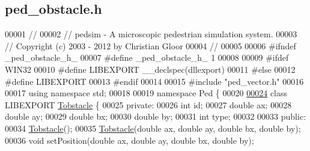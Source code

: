 \hypertarget{ped__obstacle_8h_source}{
\subsection{ped\_\-obstacle.h}
}

\begin{DoxyCode}
00001 \textcolor{comment}{//}
00002 \textcolor{comment}{// pedsim - A microscopic pedestrian simulation system. }
00003 \textcolor{comment}{// Copyright (c) 2003 - 2012 by Christian Gloor}
00004 \textcolor{comment}{//                              }
00005 
00006 \textcolor{preprocessor}{#ifndef \_ped\_obstacle\_h\_}
00007 \textcolor{preprocessor}{}\textcolor{preprocessor}{#define \_ped\_obstacle\_h\_ 1}
00008 \textcolor{preprocessor}{}
00009 \textcolor{preprocessor}{#ifdef WIN32}
00010 \textcolor{preprocessor}{}\textcolor{preprocessor}{#define LIBEXPORT \_\_declspec(dllexport)}
00011 \textcolor{preprocessor}{}\textcolor{preprocessor}{#else}
00012 \textcolor{preprocessor}{}\textcolor{preprocessor}{#define LIBEXPORT}
00013 \textcolor{preprocessor}{}\textcolor{preprocessor}{#endif}
00014 \textcolor{preprocessor}{}
00015 \textcolor{preprocessor}{#include "ped\_vector.h"}
00016 
00017 \textcolor{keyword}{using namespace }std;
00018 
00019 \textcolor{keyword}{namespace }Ped \{
00020         
\hypertarget{ped__obstacle_8h_source_l00024}{}\hyperlink{classPed_1_1Tobstacle}{00024}         \textcolor{keyword}{class }LIBEXPORT \hyperlink{classPed_1_1Tobstacle}{Tobstacle} \{
00025         \textcolor{keyword}{private}:
00026                 \textcolor{keywordtype}{int} id;                                            
00027                 \textcolor{keywordtype}{double} ax;                                         
00028                 \textcolor{keywordtype}{double} ay;                                         
00029                 \textcolor{keywordtype}{double} bx;                                         
00030                 \textcolor{keywordtype}{double} by;                                         
00031                 \textcolor{keywordtype}{int} type;                                         
00032                 
00033         \textcolor{keyword}{public}:
00034                 \hyperlink{classPed_1_1Tobstacle}{Tobstacle}();
00035                 \hyperlink{classPed_1_1Tobstacle}{Tobstacle}(\textcolor{keywordtype}{double} ax, \textcolor{keywordtype}{double} ay, \textcolor{keywordtype}{double} bx, \textcolor{keywordtype}{double} by);
00036                 \textcolor{keywordtype}{void} setPosition(\textcolor{keywordtype}{double} ax, \textcolor{keywordtype}{double} ay, \textcolor{keywordtype}{double} bx, \textcolor{keywordtype}{double} by); 

\end{DoxyCode}
